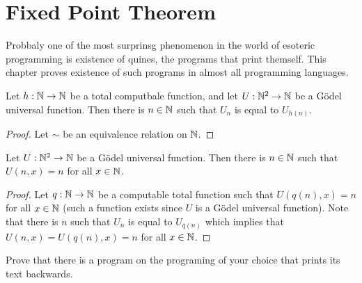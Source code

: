 \chapter{Fixed Point Theorem}
Probbaly one of the most surprinsg phenomenon in the world of esoteric 
programming is existence of quines, the programs that print themself.
This chapter proves existence of such programs in almost all programming
languages.

\begin{theorem}
  Let $h : {\mathbb{N}} \to {\mathbb{N}}$ be a total computbale function, and let $U : {\mathbb{N}}^2 \to {\mathbb{N}}$
  be a G\"odel universal function. Then there is $n \in {\mathbb{N}}$ such that $U_n$ is
  equal to $U_{h(n)}$.
\end{theorem}
\begin{proof}
  Let $\sim$ be an equivalence relation on ${\mathbb{N}}$.
\end{proof}

\begin{corollary}
  Let $U : {\mathbb{N}}^2 \to {\mathbb{N}}$ be a G\"odel universal function. Then there is $n \in
  {\mathbb{N}}$ such that $U(n, x) = n$ for all $x \in {\mathbb{N}}$.
\end{corollary}
\begin{proof}
  Let $q : {\mathbb{N}} \to {\mathbb{N}}$ be a computable total function such that $U(q(n), x) = n$
  for all $x \in {\mathbb{N}}$ (such a function exists since $U$ is a G\"odel universal
  function). Note that there is $n$ such that $U_n$ is equal to $U_{q(n)}$ which
  implies that $U(n, x) = U(q(n), x) = n$ for all $x \in {\mathbb{N}}$.
\end{proof}

\begin{exercise}
  Prove that there is a program on the programing of your choice that prints its
  text backwards.
\end{exercise}
